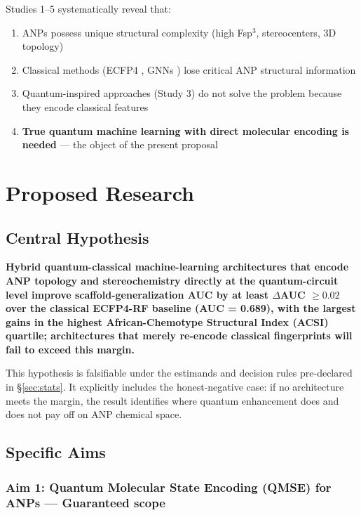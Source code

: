 \documentclass[11pt,a4paper]{article}
\begin{document}
Studies 1--5 systematically reveal that:
\begin{enumerate}
    \item ANPs possess unique structural complexity (high Fsp$^3$, stereocenters, 3D topology)
    \item Classical methods (ECFP4 \cite{rogers2010}, GNNs \cite{morris2019}) lose critical ANP structural information
    \item Quantum-inspired approaches (Study 3) do not solve the problem because they encode classical features
    \item \textbf{True quantum machine learning with direct molecular encoding is needed} --- the object of the present proposal
\end{enumerate}

\section{Proposed Research}

\subsection{Central Hypothesis}

\textbf{Hybrid quantum-classical machine-learning architectures that encode ANP topology and stereochemistry directly at the quantum-circuit level improve scaffold-generalization AUC by at least $\Delta$AUC $\geq 0.02$ over the classical ECFP4-RF baseline (AUC = 0.689), with the largest gains in the highest African-Chemotype Structural Index (ACSI) quartile; architectures that merely re-encode classical fingerprints will fail to exceed this margin.}

This hypothesis is falsifiable under the estimands and decision rules pre-declared in \S\ref{sec:stats}. It explicitly includes the honest-negative case: if no architecture meets the margin, the result identifies where quantum enhancement does and does not pay off on ANP chemical space.

\subsection{Specific Aims}

\subsubsection{Aim 1: Quantum Molecular State Encoding (QMSE) for ANPs --- Guaranteed scope}
\end{document}
